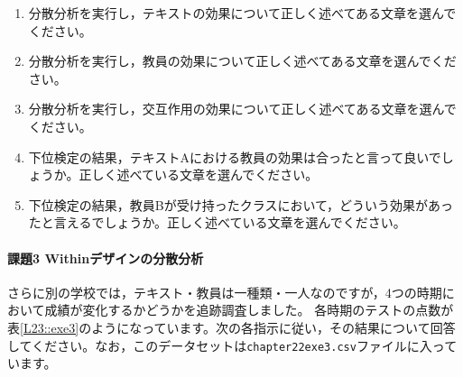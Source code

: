 \documentclass{ltjbook}
\begin{document}
\begin{enumerate}
	\item 分散分析を実行し，テキストの効果について正しく述べてある文章を選んでください。
	\item 分散分析を実行し，教員の効果について正しく述べてある文章を選んでください。
	\item 分散分析を実行し，交互作用の効果について正しく述べてある文章を選んでください。
	\item 下位検定の結果，テキストAにおける教員の効果は合ったと言って良いでしょうか。正しく述べている文章を選んでください。
	\item 下位検定の結果，教員Bが受け持ったクラスにおいて，どういう効果があったと言えるでしょうか。正しく述べている文章を選んでください。
\end{enumerate}

\paragraph{課題3 Withinデザインの分散分析}
さらに別の学校では，テキスト・教員は一種類・一人なのですが，4つの時期において成績が変化するかどうかを追跡調査しました。
各時期のテストの点数が表\ref{L23::exe3}のようになっています。次の各指示に従い，その結果について回答してください。なお，このデータセットは\texttt{chapter22exe3.csv}ファイルに入っています。
\end{document}
